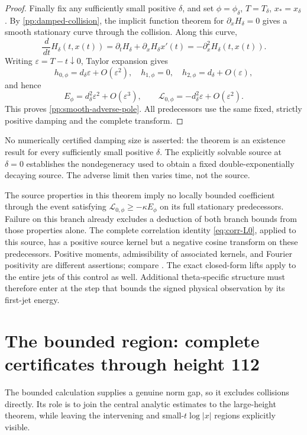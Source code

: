 \documentclass[11pt]{article}
\numberwithin{equation}{section}
\theoremstyle{definition}
\theoremstyle{remark}
\newcommand{\dd}{\,d}
\newcommand{\Lag}{\mathcal L}
\begin{document}
\begin{proof}
Finally fix any sufficiently small positive \(\delta\), and set
\(\phi=\phi_\delta\), \(T=T_\delta\), \(x_*=x_\delta\).
By \eqref{pp:damped-collision}, the implicit function theorem for
\(\partial_xH_\delta=0\) gives a smooth stationary curve through
the collision. Along this curve,
\[
 \frac{\dd}{\dd t}H_\delta(t,x(t))
  =\partial_tH_\delta+\partial_xH_\delta x'(t)
  =-\partial_x^2H_\delta(t,x(t)).
\]
Writing \(\varepsilon=T-t\downarrow0\), Taylor expansion gives
\[
 h_{0,\phi}=d_\delta\varepsilon+O(\varepsilon^2),\quad
 h_{1,\phi}=0,\quad h_{2,\phi}=d_\delta+O(\varepsilon),
\]
and hence
\[
 E_\phi=d_\delta^2\varepsilon^2+O(\varepsilon^3),\qquad
 \Lag_{0,\phi}=-d_\delta^2\varepsilon+O(\varepsilon^2).
\]
This proves \eqref{pp:smooth-adverse-pole}. All predecessors use
the same fixed, strictly positive damping and the complete transform.
\end{proof}

No numerically certified damping size is asserted: the theorem is an
existence result for every sufficiently small positive \(\delta\).
The explicitly solvable source at \(\delta=0\) establishes the
nondegeneracy used to obtain a fixed double-exponentially decaying
source. The adverse limit then varies time, not the source.

The source properties in this theorem imply no locally bounded
coefficient through the event satisfying
\(\Lag_{0,\phi}\ge-\kappa E_\phi\) on its full stationary
predecessors. Failure on this branch already excludes a deduction
of both branch bounds from those properties alone. The complete
correlation identity \eqref{eq:corr-L0}, applied to this source,
has a positive source kernel but a negative cosine transform on
these predecessors. Positive moments, admissibility of associated
kernels, and Fourier positivity are different assertions; compare
\cite[Theorems~3.5 and~4.2(b), Remark~2.1, and Example~3.12]{csordas}.
The exact closed-form lifts apply to the entire jets of this control
as well. Additional theta-specific structure must therefore enter
at the step that bounds the signed physical observation by its
first-jet energy.


\section{The bounded region: complete certificates through height 112}
\label{sec:fc-certificate}

The bounded calculation supplies a genuine norm gap, so it excludes
collisions directly.  Its role is to join the central analytic estimates
to the large-height theorem, while leaving the intervening and
small-$t\log|x|$ regions explicitly visible.
\end{document}
